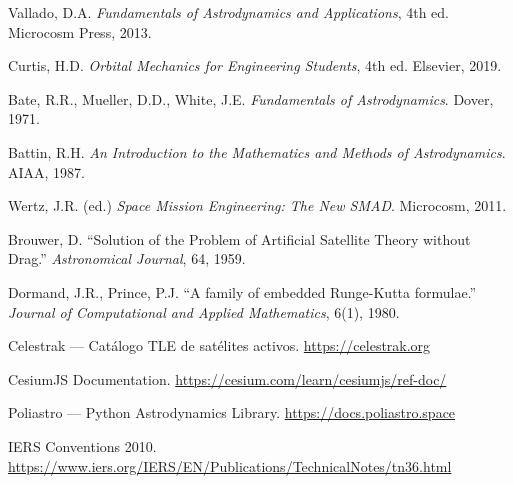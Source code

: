 \documentclass[12pt,a4paper]{article}
\begin{document}
\begin{enumerate}[label={[\arabic*]}, leftmargin=2.5em]
  \item Vallado, D.A. \textit{Fundamentals of Astrodynamics and Applications}, 4th ed. Microcosm Press, 2013.
  \item Curtis, H.D. \textit{Orbital Mechanics for Engineering Students}, 4th ed. Elsevier, 2019.
  \item Bate, R.R., Mueller, D.D., White, J.E. \textit{Fundamentals of Astrodynamics}. Dover, 1971.
  \item Battin, R.H. \textit{An Introduction to the Mathematics and Methods of Astrodynamics}. AIAA, 1987.
  \item Wertz, J.R. (ed.) \textit{Space Mission Engineering: The New SMAD}. Microcosm, 2011.
  \item Brouwer, D. ``Solution of the Problem of Artificial Satellite Theory without Drag.'' \textit{Astronomical Journal}, 64, 1959.
  \item Dormand, J.R., Prince, P.J. ``A family of embedded Runge-Kutta formulae.'' \textit{Journal of Computational and Applied Mathematics}, 6(1), 1980.
  \item Celestrak --- Cat\'alogo TLE de sat\'elites activos. \url{https://celestrak.org}
  \item CesiumJS Documentation. \url{https://cesium.com/learn/cesiumjs/ref-doc/}
  \item Poliastro --- Python Astrodynamics Library. \url{https://docs.poliastro.space}
  \item IERS Conventions 2010. \url{https://www.iers.org/IERS/EN/Publications/TechnicalNotes/tn36.html}
\end{enumerate}
\end{document}
